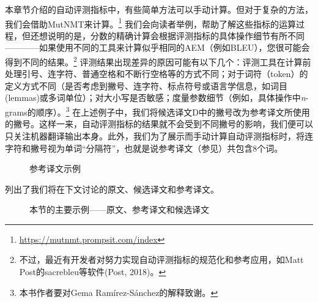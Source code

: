 \documentclass[output=paper]{langscibook}
\begin{document}
本章节介绍的自动评测指标中，有些简单方法可以手动计算。但对于复杂的方法，我们会借助MutNMT来计算。\footnote{\url{https://mutnmt.prompsit.com/index}} 我们会向读者举例，帮助了解这些指标的运算过程，但还想说明的是，分数的精确计算会根据评测指标的具体操作细节有所不同————如果使用不同的工具来计算似乎相同的AEM（例如BLEU），您很可能会得到不同的结果。\footnote{不过，最近有开发者对努力实现自动评测指标的规范化和参考应用，如Matt Post的sacrebleu等软件(Post, 2018)。} 评测结果出现差异的原因可能有以下几个：评测工具在计算前处理引号、连字符、普通空格和不断行空格等的方式不同；对于词符（token）的定义方式不同（是否考虑到撇号、连字符、标点符号或语言学信息，如词目(lemmas)或多词单位）；对大小写是否敏感；度量参数细节（例如，具体操作中\textit{n}-grams的顺序）。\footnote{本书作者要对Gema Ramírez-Sánchez的解释致谢。} 在上述例子中，我们将候选译文D中的撇号改为参考译文所使用的撇号。这样一来，自动评测指标的结果就不会受到不同撇号的影响，我们便可以只关注机器翻译输出本身。此外，我们为了展示而手动计算自动评测指标时，将连字符和撇号视为单词“分隔符”，也就是说参考译文（参见）共包含8个词。

\begin{figure}
%
\caption{参考译文示例}
\label{fig:rossi:4}
\end{figure}

 列出了我们将在下文讨论的原文、候选译文和参考译文。

\begin{figure}
\small
{}
\caption{本节的主要示例——原文、参考译文和候选译文}
\label{fig:rossi:5}
\end{figure}
\end{document}
